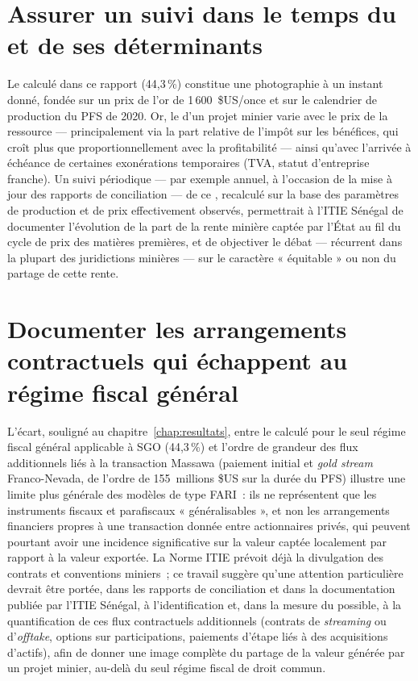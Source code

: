 \section{Assurer un suivi dans le temps du \TEMI{} et de ses déterminants}

Le \TEMI{} calculé dans ce rapport (44,3\,\%) constitue une photographie à un instant donné, fondée sur un prix de l'or de 1\,600~\$US/once et sur le calendrier de production du PFS de 2020. Or, le \TEMI{} d'un projet minier varie avec le prix de la ressource --- principalement via la part relative de l'impôt sur les bénéfices, qui croît plus que proportionnellement avec la profitabilité --- ainsi qu'avec l'arrivée à échéance de certaines exonérations temporaires (TVA, statut d'entreprise franche). Un suivi périodique --- par exemple annuel, à l'occasion de la mise à jour des rapports de conciliation --- de ce \TEMI{}, recalculé sur la base des paramètres de production et de prix effectivement observés, permettrait à l'ITIE Sénégal de documenter l'évolution de la part de la rente minière captée par l'État au fil du cycle de prix des matières premières, et de objectiver le débat --- récurrent dans la plupart des juridictions minières --- sur le caractère « équitable » ou non du partage de cette rente.

\section{Documenter les arrangements contractuels qui échappent au régime fiscal général}

L'écart, souligné au chapitre~\ref{chap:resultats}, entre le \TEMI{} calculé pour le seul régime fiscal général applicable à SGO (44,3\,\%) et l'ordre de grandeur des flux additionnels liés à la transaction Massawa (paiement initial et \emph{gold stream} Franco-Nevada, de l'ordre de 155~millions \$US sur la durée du PFS) illustre une limite plus générale des modèles de type FARI~: ils ne représentent que les instruments fiscaux et parafiscaux « généralisables », et non les arrangements financiers propres à une transaction donnée entre actionnaires privés, qui peuvent pourtant avoir une incidence significative sur la valeur captée localement par rapport à la valeur exportée. La Norme ITIE prévoit déjà la divulgation des contrats et conventions miniers~; ce travail suggère qu'une attention particulière devrait être portée, dans les rapports de conciliation et dans la documentation publiée par l'ITIE Sénégal, à l'identification et, dans la mesure du possible, à la quantification de ces flux contractuels additionnels (contrats de \emph{streaming} ou d'\emph{offtake}, options sur participations, paiements d'étape liés à des acquisitions d'actifs), afin de donner une image complète du partage de la valeur générée par un projet minier, au-delà du seul régime fiscal de droit commun.


